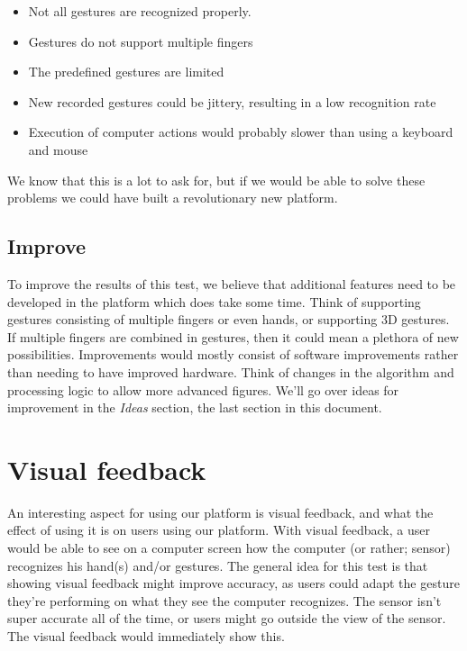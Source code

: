 \documentclass[a4paper]{article}
\providecommand{\tightlist}{%
\setlength{\itemsep}{0pt}\setlength{\parskip}{0pt}}
\begin{document}
  \begin{itemize}
    \tightlist
    \item Not all gestures are recognized properly.
    \item Gestures do not support multiple fingers
    \item The predefined gestures are limited
    \item New recorded gestures could be jittery, resulting in a low recognition
      rate
    \item Execution of computer actions would probably slower than using a
      keyboard and mouse
  \end{itemize}

  We know that this is a lot to ask for, but if we would be able to solve these
  problems we could have built a revolutionary new platform.

  \subsection*{Improve}
  To improve the results of this test, we believe that additional features need
  to be developed in the platform which does take some time. Think of supporting
  gestures consisting of multiple fingers or even hands, or supporting 3D
  gestures. If multiple fingers are combined in gestures, then it could mean a
  plethora of new possibilities. Improvements would mostly consist of software improvements rather
  than needing to have improved hardware. Think of changes in the algorithm and
  processing logic to allow more advanced figures. We'll go over ideas for
  improvement in the \emph{Ideas} section, the last section in this document.

  \clearpage

  \section*{Visual feedback}
  An interesting aspect for using our platform is visual feedback, and what the
  effect of using it is on users using our platform. With visual feedback, a
  user would be able to see on a computer screen how the computer (or rather;
  sensor) recognizes his hand(s) and/or gestures. The general idea for this test
  is that showing visual feedback might improve accuracy, as users could adapt
  the gesture they're performing on what they see the computer recognizes.
  The sensor isn't super accurate all of the time, or users might go outside the
  view of the sensor. The visual feedback would immediately show this.
\end{document}
